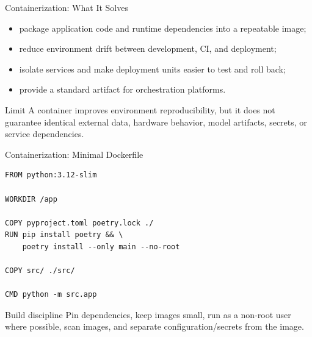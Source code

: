 \begin{frame}{Containerization: What It Solves}
\begin{itemize}
  \item package application code and runtime dependencies into a repeatable image;
  \item reduce environment drift between development, CI, and deployment;
  \item isolate services and make deployment units easier to test and roll back;
  \item provide a standard artifact for orchestration platforms.
\end{itemize}

\begin{alertblock}{Limit}
A container improves environment reproducibility, but it does not guarantee identical external data, hardware behavior, model artifacts, secrets, or service dependencies.
\end{alertblock}
\end{frame}

\begin{frame}[fragile]{Containerization: Minimal Dockerfile}
\begin{lstlisting}[style=code,basicstyle=\ttfamily\small]
FROM python:3.12-slim

WORKDIR /app

COPY pyproject.toml poetry.lock ./
RUN pip install poetry && \
    poetry install --only main --no-root

COPY src/ ./src/

CMD python -m src.app
\end{lstlisting}

\begin{block}{Build discipline}
Pin dependencies, keep images small, run as a non-root user where possible, scan images, and separate configuration/secrets from the image.
\end{block}
\end{frame}


